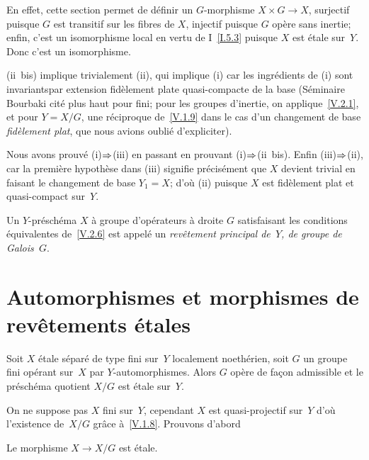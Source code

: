 En effet, cette section permet de d\'efinir un $G$-morphisme $X
\times G \to X$, surjectif puisque $G$ est transitif sur les fibres de
$X$, injectif puisque $G$ op\`ere sans inertie; enfin, c'est un
isomorphisme local en vertu de I~\ref{I.5.3} puisque $X$ est \'etale
sur~$Y$. Donc c'est un isomorphisme.

(ii~bis)
implique trivialement (ii), qui implique (i) car les ingr\'edients
de (i) sont \og invariants\fg par extension fid\`element plate
quasi-compacte de la base (\cf S\'eminaire Bourbaki cit\'e plus
haut pour \og fini\fg; pour les groupes d'inertie, on
applique~\ref{V.2.1}, et pour $Y=X/G$, une r\'eciproque
de~\ref{V.1.9} dans le cas d'un changement de base
\emph{fidèlement plat}, que nous avions oubli\'e d'expliciter).

Nous avons prouv\'e (i)$\To$(iii) en passant en prouvant
(i)$\To$(ii~bis). Enfin (iii)$\To$(ii), car la
premi\`ere hypoth\`ese dans (iii) signifie pr\'ecis\'ement que
$X$ devient trivial en faisant le changement de base $Y_1=X$; d'o\`u
(ii) puisque $X$ est fid\`element plat et quasi-compact sur~$Y$.

\begin{definition}
\label{V.2.8} Un $Y$-pr\'esch\'ema $X$ \`a groupe
d'op\'erateurs \`a droite $G$ satisfaisant les conditions
\'equivalentes de~\ref{V.2.6} est appel\'e un \emph{revêtement
principal de~$Y$, de groupe de Galois~$G$}.
\end{definition}

\section{Automorphismes et morphismes de rev\^etements \'etales}
\label{V.3}

\begin{proposition}
\label{V.3.1} Soit $X$ \'etale s\'epar\'e de type fini sur~$Y$ localement noeth\'erien, soit $G$ un groupe fini op\'erant sur~$X$ par $Y$-automorphismes. Alors $G$ op\`ere de fa\c con
admissible et le pr\'esch\'ema quotient $X/G$ est \'etale sur~$Y$.
\end{proposition}

On ne suppose pas $X$ fini sur~$Y$, cependant $X$ est quasi-projectif
sur~$Y$ d'o\`u l'existence de~$X/G$ gr\^ace
\`a~\ref{V.1.8}. Prouvons d'abord

\begin{corollaire}
\label{V.3.2} Le morphisme $X \to X/G$ est \'etale.
\end{corollaire}

